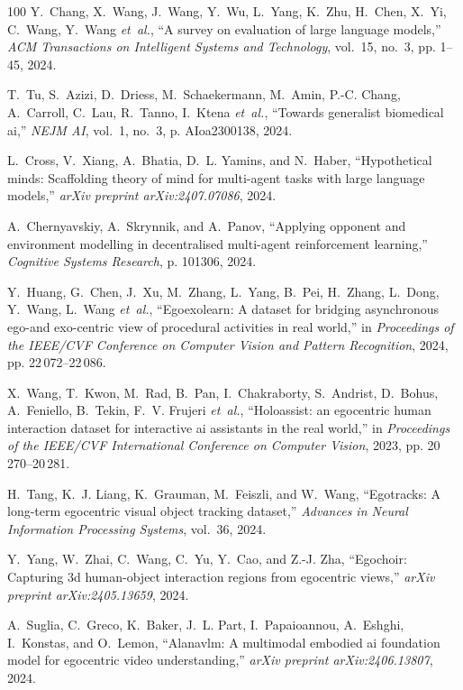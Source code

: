 \documentclass[10pt,journal,compsoc]{IEEEtran}
\begin{document}
\begin{thebibliography}{100}
	Y.~Chang, X.~Wang, J.~Wang, Y.~Wu, L.~Yang, K.~Zhu, H.~Chen, X.~Yi, C.~Wang,
	Y.~Wang \emph{et~al.}, ``A survey on evaluation of large language models,''
	\emph{ACM Transactions on Intelligent Systems and Technology}, vol.~15,
	no.~3, pp. 1--45, 2024.
	
	T.~Tu, S.~Azizi, D.~Driess, M.~Schaekermann, M.~Amin, P.-C. Chang, A.~Carroll,
	C.~Lau, R.~Tanno, I.~Ktena \emph{et~al.}, ``Towards generalist biomedical
	ai,'' \emph{NEJM AI}, vol.~1, no.~3, p. AIoa2300138, 2024.
	
	L.~Cross, V.~Xiang, A.~Bhatia, D.~L. Yamins, and N.~Haber, ``Hypothetical
	minds: Scaffolding theory of mind for multi-agent tasks with large language
	models,'' \emph{arXiv preprint arXiv:2407.07086}, 2024.
	
	A.~Chernyavskiy, A.~Skrynnik, and A.~Panov, ``Applying opponent and environment
	modelling in decentralised multi-agent reinforcement learning,''
	\emph{Cognitive Systems Research}, p. 101306, 2024.
	
	Y.~Huang, G.~Chen, J.~Xu, M.~Zhang, L.~Yang, B.~Pei, H.~Zhang, L.~Dong,
	Y.~Wang, L.~Wang \emph{et~al.}, ``Egoexolearn: A dataset for bridging
	asynchronous ego-and exo-centric view of procedural activities in real
	world,'' in \emph{Proceedings of the IEEE/CVF Conference on Computer Vision
		and Pattern Recognition}, 2024, pp. 22\,072--22\,086.
	
	X.~Wang, T.~Kwon, M.~Rad, B.~Pan, I.~Chakraborty, S.~Andrist, D.~Bohus,
	A.~Feniello, B.~Tekin, F.~V. Frujeri \emph{et~al.}, ``Holoassist: an
	egocentric human interaction dataset for interactive ai assistants in the
	real world,'' in \emph{Proceedings of the IEEE/CVF International Conference
		on Computer Vision}, 2023, pp. 20\,270--20\,281.
	
	H.~Tang, K.~J. Liang, K.~Grauman, M.~Feiszli, and W.~Wang, ``Egotracks: A
	long-term egocentric visual object tracking dataset,'' \emph{Advances in
		Neural Information Processing Systems}, vol.~36, 2024.
	
	Y.~Yang, W.~Zhai, C.~Wang, C.~Yu, Y.~Cao, and Z.-J. Zha, ``Egochoir: Capturing
	3d human-object interaction regions from egocentric views,'' \emph{arXiv
		preprint arXiv:2405.13659}, 2024.
	
	A.~Suglia, C.~Greco, K.~Baker, J.~L. Part, I.~Papaioannou, A.~Eshghi,
	I.~Konstas, and O.~Lemon, ``Alanavlm: A multimodal embodied ai foundation
	model for egocentric video understanding,'' \emph{arXiv preprint
		arXiv:2406.13807}, 2024.
	

\end{thebibliography}
\end{document}
